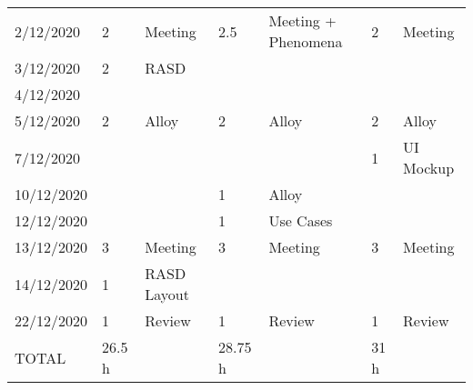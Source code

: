 \begin{table}[h]
{\begin{tabular}{|l|l|p{2.5cm}|l|p{2.5cm}|l|p{2.5cm}|}
2/12/2020& 2& Meeting& 2.5& Meeting + Phenomena& 2& Meeting\\
3/12/2020& 2& RASD &&&&\\
4/12/2020&&&&&&\\
5/12/2020& 2& Alloy& 2& Alloy& 2& Alloy\\
7/12/2020&&&&& 1& UI Mockup\\
10/12/2020&&& 1& Alloy&&\\
12/12/2020&&& 1& Use Cases&&\\
13/12/2020& 3& Meeting& 3& Meeting& 3& Meeting\\
14/12/2020& 1& RASD Layout&&&&\\
22/12/2020& 1& Review& 1& Review& 1& Review\\
\hline
TOTAL& 26.5 h&& 28.75 h && 31 h&\\
\hline
\end{tabular}
}
\end{table}
